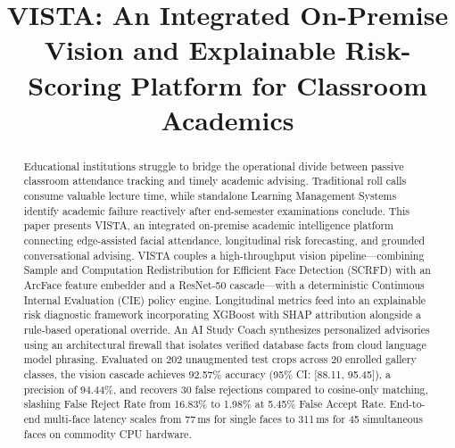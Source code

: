 \documentclass[conference]{IEEEtran}
\begin{document}
\title{VISTA: An Integrated On-Premise Vision and Explainable Risk-Scoring Platform for Classroom Academics}

\author{
}

\maketitle

\begin{abstract}
Educational institutions struggle to bridge the operational divide between passive classroom attendance tracking and timely academic advising. Traditional roll calls consume valuable lecture time, while standalone Learning Management Systems identify academic failure reactively after end-semester examinations conclude. This paper presents VISTA, an integrated on-premise academic intelligence platform connecting edge-assisted facial attendance, longitudinal risk forecasting, and grounded conversational advising. VISTA couples a high-throughput vision pipeline—combining Sample and Computation Redistribution for Efficient Face Detection (SCRFD) with an ArcFace feature embedder and a ResNet-50 cascade—with a deterministic Continuous Internal Evaluation (CIE) policy engine. Longitudinal metrics feed into an explainable risk diagnostic framework incorporating XGBoost with SHAP attribution alongside a rule-based operational override. An AI Study Coach synthesizes personalized advisories using an architectural firewall that isolates verified database facts from cloud language model phrasing. Evaluated on 202 unaugmented test crops across 20 enrolled gallery classes, the vision cascade achieves 92.57\% accuracy (95\% CI: [88.11, 95.45]), a precision of 94.44\%, and recovers 30 false rejections compared to cosine-only matching, slashing False Reject Rate from 16.83\% to 1.98\% at 5.45\% False Accept Rate. End-to-end multi-face latency scales from 77\,ms for single faces to 311\,ms for 45 simultaneous faces on commodity CPU hardware.
\end{abstract}
\end{document}
